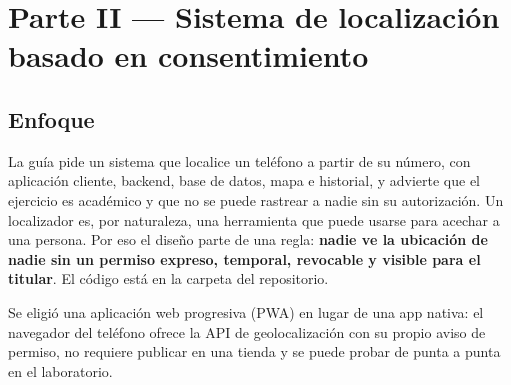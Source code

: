\chapter{Parte II — Sistema de localización basado en consentimiento}\label{cap:parte2}

\section{Enfoque}
La guía pide un sistema que localice un teléfono a partir de su número, con aplicación cliente, backend, base de datos, mapa e historial, y advierte que el ejercicio es académico y que no se puede rastrear a nadie sin su autorización. Un localizador es, por naturaleza, una herramienta que puede usarse para acechar a una persona. Por eso el diseño parte de una regla: \textbf{nadie ve la ubicación de nadie sin un permiso expreso, temporal, revocable y visible para el titular}. El código está en la carpeta  del repositorio.

Se eligió una aplicación web progresiva (PWA) en lugar de una app nativa: el navegador del teléfono ofrece la API de geolocalización con su propio aviso de permiso, no requiere publicar en una tienda y se puede probar de punta a punta en el laboratorio.

